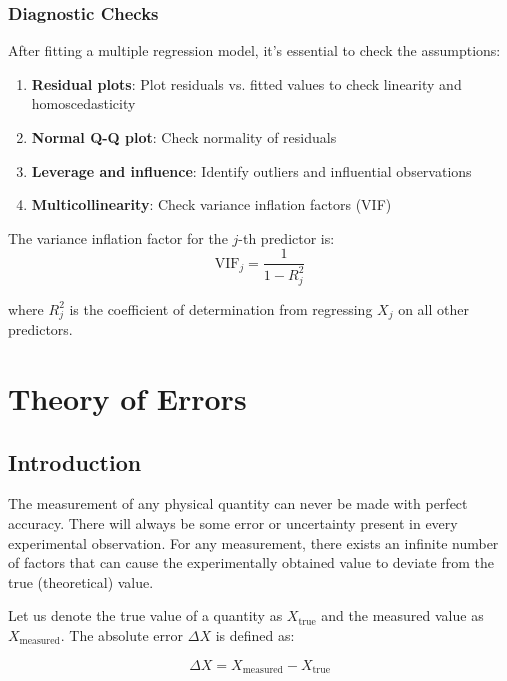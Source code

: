 \documentclass[twoside]{book}
\begin{document}
\subsection{Diagnostic Checks}

After fitting a multiple regression model, it's essential to check the assumptions:

\begin{enumerate}
    \item \textbf{Residual plots}: Plot residuals vs. fitted values to check linearity and homoscedasticity
    \item \textbf{Normal Q-Q plot}: Check normality of residuals
    \item \textbf{Leverage and influence}: Identify outliers and influential observations
    \item \textbf{Multicollinearity}: Check variance inflation factors (VIF)
\end{enumerate}

The variance inflation factor for the $j$-th predictor is:
\begin{equation}
\text{VIF}_j = \frac{1}{1-R_j^2}
\end{equation}

where $R_j^2$ is the coefficient of determination from regressing $X_j$ on all other predictors.


\chapter{Theory of Errors}

\section{Introduction}

The measurement of any physical quantity can never be made with perfect accuracy. There will always be some error or uncertainty present in every experimental observation. For any measurement, there exists an infinite number of factors that can cause the experimentally obtained value to deviate from the true (theoretical) value.

Let us denote the true value of a quantity as $X_{\text{true}}$ and the measured value as $X_{\text{measured}}$. The absolute error $\Delta X$ is defined as:

\begin{equation*}
\Delta X = X_{\text{measured}} - X_{\text{true}}
\end{equation*}
\end{document}
